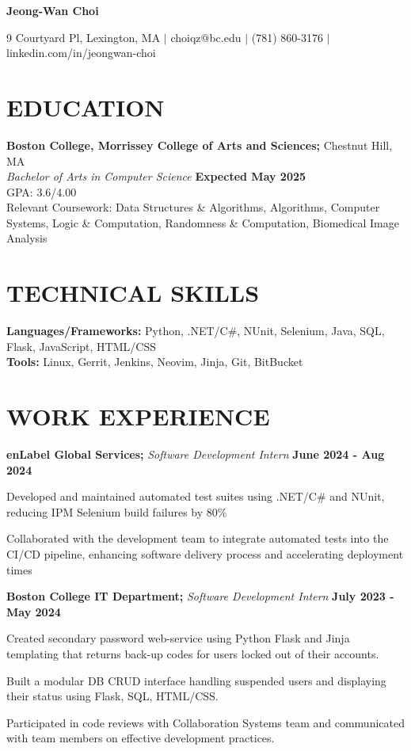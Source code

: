 \documentclass[11pt]{article}
\begin{document}
\begin{center}
\textbf{\LARGE Jeong-Wan Choi}
\end{center}

\begin{center}
9 Courtyard Pl, Lexington, MA $|$ choiqz@bc.edu $|$ (781) 860-3176 $|$ linkedin.com/in/jeongwan-choi 
\end{center}

\section*{EDUCATION}
\textbf{Boston College, Morrissey College of Arts and Sciences;} Chestnut Hill, MA \\
\textit{Bachelor of Arts in Computer Science} \hfill \textbf{Expected May 2025} \\
GPA: 3.6/4.00 \\
Relevant Coursework: Data Structures \& Algorithms, Algorithms, Computer Systems, Logic \& Computation, Randomness \& Computation, Biomedical Image Analysis 

\section*{TECHNICAL SKILLS}
\textbf{Languages/Frameworks:} Python, .NET/C\#, NUnit, Selenium, Java, SQL, Flask, JavaScript, HTML/CSS\\
\textbf{Tools:} Linux, Gerrit, Jenkins, Neovim, Jinja, Git, BitBucket 

\section*{WORK EXPERIENCE}
\textbf{enLabel Global Services;} \textit{Software Development Intern} \hfill \textbf{June 2024 - Aug 2024}
\begin{sublist}
	\item Developed and maintained automated test suites using .NET/C\# and NUnit, reducing IPM Selenium build failures by 80\%  
	\item Collaborated with the development team to integrate automated tests into the CI/CD pipeline, enhancing software delivery process and accelerating deployment times
\end{sublist}

\raggedright
\textbf{Boston College IT Department;} \textit{Software Development Intern} \hfill \textbf{July 2023 - May 2024}
\begin{sublist}
	\item Created secondary password web-service using Python Flask and Jinja templating that returns back-up codes for users locked out of their accounts. 
	\item Built a modular DB CRUD interface handling suspended users and displaying their status using Flask, SQL, HTML/CSS.
	\item Participated in code reviews with Collaboration Systems team and communicated with team members on effective development practices.
\end{sublist}
\end{document}
